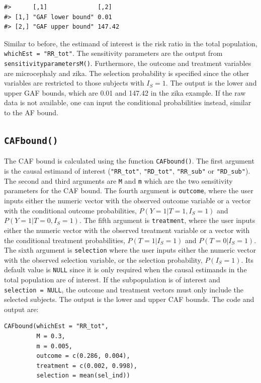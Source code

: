 \begin{verbatim}
#>      [,1]              [,2]  
#> [1,] "GAF lower bound" 0.01  
#> [2,] "GAF upper bound" 147.42
\end{verbatim}

Similar to before, the estimand of interest is the risk ratio in the total
population, \texttt{whichEst\ =\ "RR\_tot"}. The sensitivity parameters are the
output from \texttt{sensitivityparametersM()}. Furthermore, the outcome and treatment
variables are microcephaly and zika. The selection probability is specified
since the other variables are restricted to those subjects with \(I_S=1\). The
output is the lower and upper GAF bounds, which are 0.01 and 147.42 in the
zika example. If the raw data is not available, one can input the conditional
probabilities instead, similar to the AF bound.

\subsection{\texorpdfstring{\texttt{CAFbound()}}{CAFbound()}}\label{cafbound}

The CAF bound is calculated using the function \texttt{CAFbound()}. The first argument
is the causal estimand of interest (\texttt{"RR\_tot"}, \texttt{"RD\_tot"}, \texttt{"RR\_sub"} or
\texttt{"RD\_sub"}). The second and third arguments are \texttt{M} and \texttt{m} which are the two
sensitivity parameters for the CAF bound. The fourth argument is \texttt{outcome},
where the user inputs either the numeric vector with the observed outcome
variable or a vector with the conditional outcome probabilities,
\(P(Y=1|T=1,I_S=1)\) and \(P(Y=1|T=0,I_S=1)\). The fifth argument is \texttt{treatment},
where the user inputs either the numeric vector with the observed treatment
variable or a vector with the conditional treatment probabilities,
\(P(T=1|I_S=1)\) and \(P(T=0|I_S=1)\). The sixth argument is \texttt{selection} where the
user inputs either the numeric vector with the observed selection variable, or
the selection probability, \(P(I_S=1)\). Its default value is \texttt{NULL} since it is
only required when the causal estimands in the total population are of interest.
If the subpopulation is of interest and \texttt{selection\ =\ NULL}, the outcome and
treatment vectors must only include the selected subjects. The output is the
lower and upper CAF bounds. The code and output are:

\begin{verbatim}
CAFbound(whichEst = "RR_tot",
         M = 0.3,
         m = 0.005, 
         outcome = c(0.286, 0.004),
         treatment = c(0.002, 0.998),
         selection = mean(sel_ind))
\end{verbatim}

